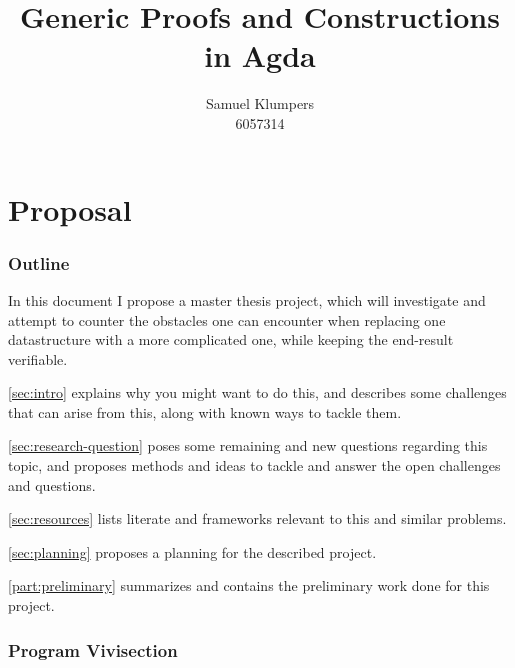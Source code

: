 \documentclass{article}
\title{Generic Proofs and Constructions in Agda}
\author{Samuel Klumpers\\6057314}
\theoremstyle{plain}%
\theoremstyle{definition}
\begin{document}
\maketitle
\tableofcontents

\newpage

\begin{comment}
\begin{abstract} %
    This thesis introduces the concepts of the structure identity principle, numerical representations, and ornamentations, and aims to combine these to simplify the presentation and verification of finger trees, demonstrating the generalizability and improved compactness and security of the resulting code. 
\end{abstract}
\end{comment}

\part{Proposal}
\section{Outline}
In this document I propose a master thesis project, which will investigate and attempt to counter the obstacles one can encounter when replacing one datastructure with a more complicated one, while keeping the end-result verifiable.

\autoref{sec:intro} explains why you might want to do this, and describes some challenges that can arise from this, along with known ways to tackle them.

\autoref{sec:research-question} poses some remaining and new questions regarding this topic, and proposes methods and ideas to tackle and answer the open challenges and questions.

\autoref{sec:resources} lists literate and frameworks relevant to this and similar problems.

\autoref{sec:planning} proposes a planning for the described project.

\autoref{part:preliminary} summarizes and contains the preliminary work done for this project.

\section{Program Vivisection}\label{sec:intro}

\end{document}
